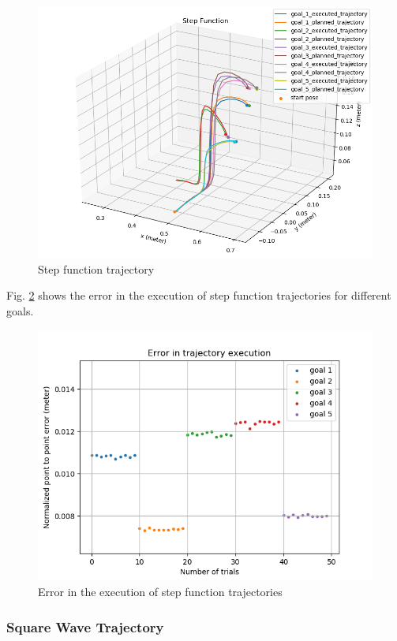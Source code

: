 \begin{figure}[H]
	\includegraphics[width=\textwidth]{images/1/step.png}
	\caption{Step function trajectory}
	\label{fig:step_fun}
\end{figure}

Fig. \ref{fig:step_fun_e} shows the error in the execution of step function trajectories for different goals. 

\begin{figure}[H]
	\centering
	\includegraphics[scale=0.60]{images/1/step_e.png}
	\caption{Error in the execution of step function trajectories}
	\label{fig:step_fun_e}
\end{figure}

\subsubsection{Square Wave Trajectory}

